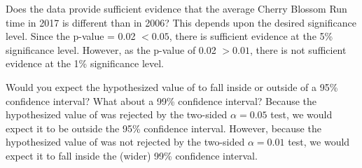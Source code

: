 \begin{examplewrap}
\begin{nexample}{Does the data provide sufficient evidence that the average Cherry Blossom Run time in 2017 is different than in 2006?}
This depends upon the desired significance level.  Since the p-value = 0.02 $< 0.05$, there is sufficient evidence at the 5\% significance level.  However, as the p-value of 0.02 $> 0.01$, there is not sufficient evidence at the 1\% significance level.
\end{nexample}
\end{examplewrap}


\begin{examplewrap}
\begin{nexample}{Would you expect the hypothesized value of \cherryblossomnull{} to fall inside or outside of a 95\% confidence interval?  What about a 99\% confidence interval?} 
Because the hypothesized value of \cherryblossomnull{} was rejected by the two-sided $\alpha=0.05$ test, we would expect it to be outside the 95\% confidence interval.  However, because the hypothesized value of \cherryblossomnull{} was not rejected by the two-sided $\alpha=0.01$ test, we would expect it to fall inside the (wider) 99\% confidence interval.  
\end{nexample}
\end{examplewrap}


